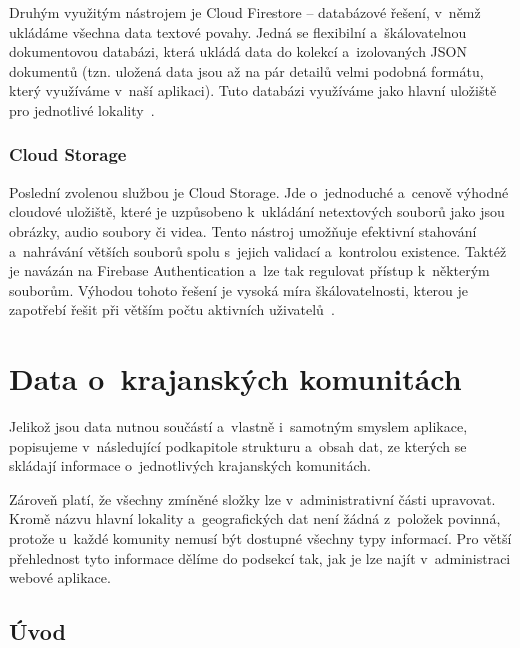 Druhým využitým nástrojem je Cloud Firestore -- databázové řešení, v~němž ukládáme všechna data textové povahy. Jedná se flexibilní a~škálovatelnou dokumentovou databázi, která ukládá data do kolekcí a~izolovaných JSON dokumentů (tzn. uložená data jsou až na pár detailů velmi podobná formátu, který využíváme v~naší aplikaci). Tuto databázi využíváme jako hlavní uložiště pro jednotlivé lokality~\parencite{firestore}.

\hypertarget{cloud-storage}{%
\subsubsection{Cloud Storage}\label{cloud-storage}}

Poslední zvolenou službou je Cloud Storage. Jde o~jednoduché a~cenově výhodné cloudové uložiště, které je uzpůsobeno k~ukládání netextových souborů jako jsou obrázky, audio soubory či videa. Tento nástroj umožňuje efektivní stahování a~nahrávání větších souborů spolu s~jejich validací a~kontrolou existence. Taktéž je navázán na Firebase Authentication a~lze tak regulovat přístup k~některým souborům. Výhodou tohoto řešení je vysoká míra škálovatelnosti, kterou je zapotřebí řešit při větším počtu aktivních uživatelů~\parencite{storage}.

\hypertarget{data-o-krajanskuxfdch-komunituxe1ch}{%
\section{Data o~krajanských komunitách}\label{data-o-krajanskuxfdch-komunituxe1ch}}

Jelikož jsou data nutnou součástí a~vlastně i~samotným smyslem aplikace, popisujeme v~následující podkapitole strukturu a~obsah dat, ze kterých se skládají informace o~jednotlivých krajanských komunitách.

Zároveň platí, že všechny zmíněné složky lze v~administrativní části upravovat. Kromě názvu hlavní lokality a~geografických dat není žádná z~položek povinná, protože u~každé komunity nemusí být dostupné všechny typy informací. Pro větší přehlednost tyto informace dělíme do podsekcí tak, jak je lze najít v~administraci webové aplikace.

\hypertarget{uxfavod}{%
\subsection{Úvod}\label{uxfavod}}

